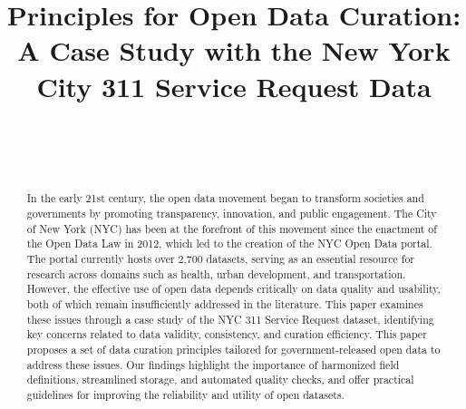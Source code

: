 \documentclass[linenumber]{jdsart}
\begin{document}


\begin{frontmatter}

\title{Principles for Open Data Curation: A Case Study with the New
York City 311 Service Request Data}

\author[1]{~}
\author[2]{~}
\address[1]{, }
\address[2]{Department of Statistics,
, }


\begin{abstract}
In the early 21st century, the open data movement began to transform 
societies and governments by promoting transparency,
innovation, and public engagement. The City of New York (NYC) has been at
the forefront of this movement since the enactment of the Open 
Data Law in 2012, which led to the creation of the NYC Open Data
portal. The portal currently hosts over 2,700 datasets,
serving as an essential resource for research across domains such as 
health, urban development, and transportation. However, the effective 
use of open data depends critically on data quality and usability, 
both of which remain insufficiently addressed in the literature. 
This paper examines these issues through a case study of the NYC 311
Service Request dataset, identifying key concerns related to data
validity, consistency, and curation efficiency.
This paper proposes a set of data curation principles tailored for 
government-released open data to address these issues. Our findings highlight 
the importance of harmonized field definitions,
streamlined storage, and automated quality checks, and offer practical
guidelines for improving the reliability and utility of open datasets.

\end{abstract}

\begin{keywords} %
\end{keywords}

\end{frontmatter}

\end{document}
